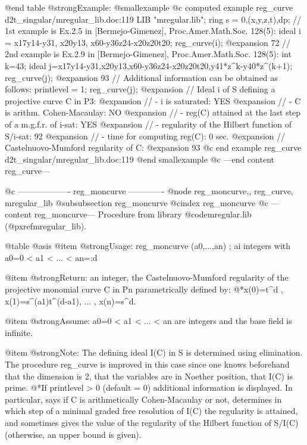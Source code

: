@end table
@strong{Example:}
@smallexample
@c computed example reg_curve d2t_singular/mregular_lib.doc:119 
LIB "mregular.lib";
ring s = 0,(x,y,z,t),dp;
// 1st example is Ex.2.5 in [Bermejo-Gimenez], Proc.Amer.Math.Soc. 128(5):
ideal i  = x17y14-y31, x20y13, x60-y36z24-x20z20t20;
reg_curve(i);
@expansion{} 72
// 2nd example is Ex.2.9 in [Bermejo-Gimenez], Proc.Amer.Math.Soc. 128(5):
int k=43;
ideal j=x17y14-y31,x20y13,x60-y36z24-x20z20t20,y41*z^k-y40*z^(k+1);
reg_curve(j);
@expansion{} 93
// Additional information can be obtained as follows:
printlevel = 1;
reg_curve(j);
@expansion{} // Ideal i of S defining a projective curve C in P3:
@expansion{} //   - i is saturated: YES
@expansion{} //   - C is arithm. Cohen-Macaulay: NO
@expansion{} //   - reg(C) attained at the last step of a m.g.f.r. of i-sat: YES
@expansion{} //   - regularity of the Hilbert function of S/i-sat: 92
@expansion{} //   - time for computing reg(C): 0 sec.
@expansion{} // Castelnuovo-Mumford regularity of C:
@expansion{} 93
@c end example reg_curve d2t_singular/mregular_lib.doc:119
@end smallexample
@c ---end content reg_curve---

@c ------------------- reg_moncurve -------------
@node reg_moncurve,, reg_curve, mregular_lib
@subsubsection reg_moncurve
@cindex reg_moncurve
@c ---content reg_moncurve---
Procedure from library @code{mregular.lib} (@pxref{mregular_lib}).

@table @asis
@item @strong{Usage:}
reg_moncurve (a0,...,an) ; ai integers with a0=0 < a1 < ... < an=:d

@item @strong{Return:}
an integer, the Castelnuovo-Mumford regularity of the projective
monomial curve C in Pn parametrically defined by:
@*x(0)=t^d , x(1)=s^(a1)t^(d-a1), ... , x(n)=s^d.

@item @strong{Assume:}
a0=0 < a1 < ... < an are integers and the base field is infinite.

@item @strong{Note:}
The defining ideal I(C) in S is determined using elimination.
The procedure reg_curve is improved in this case since one
knows beforehand that the dimension is 2, that the variables are
in Noether position, that I(C) is prime.
@*If printlevel > 0 (default = 0) additional information is displayed.
In particular, says if C is arithmetically Cohen-Macaulay or not,
determines in which step of a minimal graded free resolution of I(C)
the regularity is attained, and sometimes gives the value of the
regularity of the Hilbert function of S/I(C) (otherwise, an upper
bound is given).

